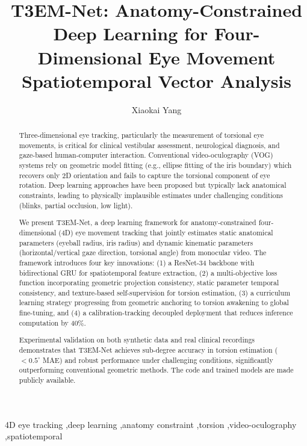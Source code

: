 \documentclass[review]{elsarticle}
\begin{document}
\begin{frontmatter}

\title{T3EM-Net: Anatomy-Constrained Deep Learning for Four-Dimensional Eye Movement Spatiotemporal Vector Analysis}

\author[1]{Xiaokai Yang}


\begin{abstract}
Three-dimensional eye tracking, particularly the measurement of torsional eye movements, is critical for clinical vestibular assessment, neurological diagnosis, and gaze-based human-computer interaction. Conventional video-oculography (VOG) systems rely on geometric model fitting (e.g., ellipse fitting of the iris boundary) which recovers only 2D orientation and fails to capture the torsional component of eye rotation. Deep learning approaches have been proposed but typically lack anatomical constraints, leading to physically implausible estimates under challenging conditions (blinks, partial occlusion, low light).

We present T3EM-Net, a deep learning framework for anatomy-constrained four-dimensional (4D) eye movement tracking that jointly estimates static anatomical parameters (eyeball radius, iris radius) and dynamic kinematic parameters (horizontal/vertical gaze direction, torsional angle) from monocular video. The framework introduces four key innovations: (1) a ResNet-34 backbone with bidirectional GRU for spatiotemporal feature extraction, (2) a multi-objective loss function incorporating geometric projection consistency, static parameter temporal consistency, and texture-based self-supervision for torsion estimation, (3) a curriculum learning strategy progressing from geometric anchoring to torsion awakening to global fine-tuning, and (4) a calibration-tracking decoupled deployment that reduces inference computation by 40\%.

Experimental validation on both synthetic data and real clinical recordings demonstrates that T3EM-Net achieves sub-degree accuracy in torsion estimation ($<0.5^\circ$ MAE) and robust performance under challenging conditions, significantly outperforming conventional geometric methods. The code and trained models are made publicly available.
\end{abstract}

\begin{keyword}
4D eye tracking \sep deep learning \sep anatomy constraint \sep torsion \sep video-oculography \sep spatiotemporal
\end{keyword}

\end{frontmatter}
\end{document}
